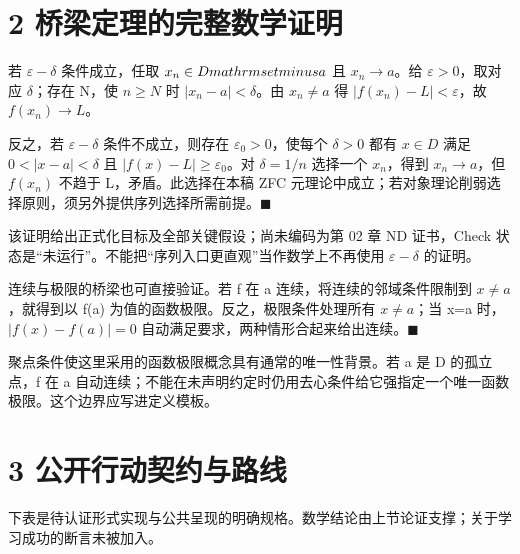 \documentclass[UTF8,a4paper,zihao=-4,fontset=windows,openany]{ctexbook}
\def\mathrm#1{#1}%
\begin{document}
\section{2 桥梁定理的完整数学证明}
若 \(\varepsilon-\delta\) 条件成立，任取 \(x_n\in D\\mathrm{setminus} {a}\) 且 \(x_n\to a\)。给 \(\varepsilon>0\)，取对应 \(\delta\)；存在 N，使 \(n\ge N\) 时 \(|x_n-a|<\delta\)。由 \(x_n\ne a\) 得 \(|f(x_n)-L|<\varepsilon\)，故 \(f(x_n)\to L\)。

反之，若 \(\varepsilon-\delta\) 条件不成立，则存在 \(\varepsilon_{0}>0\)，使每个 \(\delta>0\) 都有 \(x\in D\) 满足 \(0<|x-a|<\delta\) 且 \(|f(x)-L|\ge\varepsilon_{0}\)。对 \(\delta=1/n\) 选择一个 \(x_n\)，得到 \(x_n\to a\)，但 \(f(x_n)\) 不趋于 L，矛盾。此选择在本稿 ZFC 元理论中成立；若对象理论削弱选择原则，须另外提供序列选择所需前提。\(\blacksquare\)

该证明给出正式化目标及全部关键假设；尚未编码为第 02 章 ND 证书，Check 状态是“未运行”。不能把“序列入口更直观”当作数学上不再使用 \(\varepsilon-\delta\) 的证明。

连续与极限的桥梁也可直接验证。若 f 在 a 连续，将连续的邻域条件限制到 \(x\ne a\)，就得到以 f(a) 为值的函数极限。反之，极限条件处理所有 \(x\ne a\)；当 x=a 时，\(|f(x)-f(a)|=0\) 自动满足要求，两种情形合起来给出连续。\(\blacksquare\)

聚点条件使这里采用的函数极限概念具有通常的唯一性背景。若 a 是 D 的孤立点，f 在 a 自动连续；不能在未声明约定时仍用去心条件给它强指定一个唯一函数极限。这个边界应写进定义模板。

\section{3 公开行动契约与路线}
下表是待认证形式实现与公共呈现的明确规格。数学结论由上节论证支撑；关于学习成功的断言未被加入。
\end{document}
